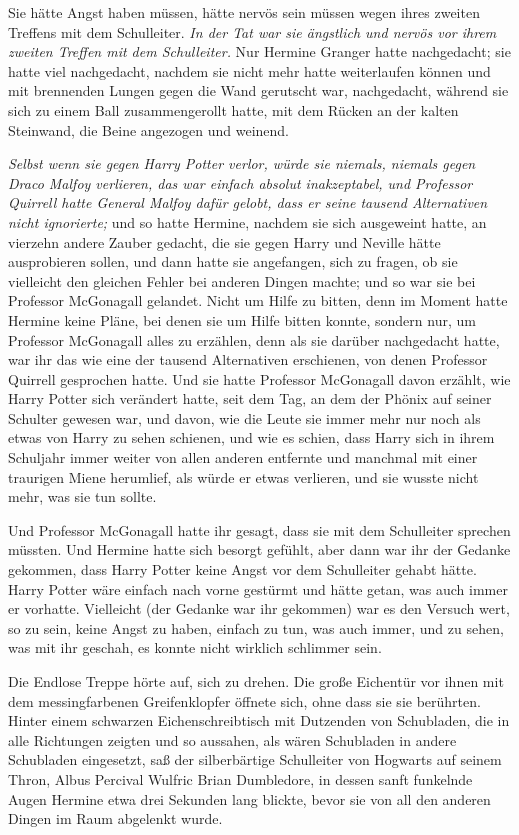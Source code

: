 Sie hätte Angst haben müssen, hätte nervös sein müssen wegen ihres zweiten
Treffens mit dem Schulleiter. \emph{In der Tat war sie ängstlich und nervös vor
ihrem zweiten Treffen mit dem Schulleiter.} Nur Hermine Granger hatte
nachgedacht; sie hatte viel nachgedacht, nachdem sie nicht mehr hatte
weiterlaufen können und mit brennenden Lungen gegen die Wand gerutscht war,
nachgedacht, während sie sich zu einem Ball zusammengerollt hatte, mit dem
Rücken an der kalten Steinwand, die Beine angezogen und weinend.

\emph{Selbst wenn sie gegen Harry Potter verlor, würde sie niemals, niemals
gegen Draco Malfoy verlieren, das war einfach absolut inakzeptabel, und
Professor Quirrell hatte General Malfoy dafür gelobt, dass er seine tausend
Alternativen nicht ignorierte;} und so hatte Hermine, nachdem sie sich
ausgeweint hatte, an vierzehn andere Zauber gedacht, die sie gegen Harry und
Neville hätte ausprobieren sollen, und dann hatte sie angefangen, sich zu
fragen, ob sie vielleicht den gleichen Fehler bei anderen Dingen machte; und so
war sie bei Professor McGonagall gelandet. Nicht um Hilfe zu bitten, denn im
Moment hatte Hermine keine Pläne, bei denen sie um Hilfe bitten konnte, sondern
nur, um Professor McGonagall alles zu erzählen, denn als sie darüber nachgedacht
hatte, war ihr das wie eine der tausend Alternativen erschienen, von denen
Professor Quirrell gesprochen hatte. Und sie hatte Professor McGonagall davon
erzählt, wie Harry Potter sich verändert hatte, seit dem Tag, an dem der Phönix
auf seiner Schulter gewesen war, und davon, wie die Leute sie immer mehr nur
noch als etwas von Harry zu sehen schienen, und wie es schien, dass Harry sich
in ihrem Schuljahr immer weiter von allen anderen entfernte und manchmal mit
einer traurigen Miene herumlief, als würde er etwas verlieren, und sie wusste
nicht mehr, was sie tun sollte.

Und Professor McGonagall hatte ihr gesagt, dass sie mit dem Schulleiter sprechen
müssten. Und Hermine hatte sich besorgt gefühlt, aber dann war ihr der Gedanke
gekommen, dass Harry Potter keine Angst vor dem Schulleiter gehabt hätte. Harry
Potter wäre einfach nach vorne gestürmt und hätte getan, was auch immer er
vorhatte. Vielleicht (der Gedanke war ihr gekommen) war es den Versuch wert, so
zu sein, keine Angst zu haben, einfach zu tun, was auch immer, und zu sehen, was
mit ihr geschah, es konnte nicht wirklich schlimmer sein.

Die Endlose Treppe hörte auf, sich zu drehen. Die große Eichentür vor ihnen mit
dem messingfarbenen Greifenklopfer öffnete sich, ohne dass sie sie berührten.
Hinter einem schwarzen Eichenschreibtisch mit Dutzenden von Schubladen, die in
alle Richtungen zeigten und so aussahen, als wären Schubladen in andere
Schubladen eingesetzt, saß der silberbärtige Schulleiter von Hogwarts auf seinem
Thron, Albus Percival Wulfric Brian Dumbledore, in dessen sanft funkelnde Augen
Hermine etwa drei Sekunden lang blickte, bevor sie von all den anderen Dingen im
Raum abgelenkt wurde.

